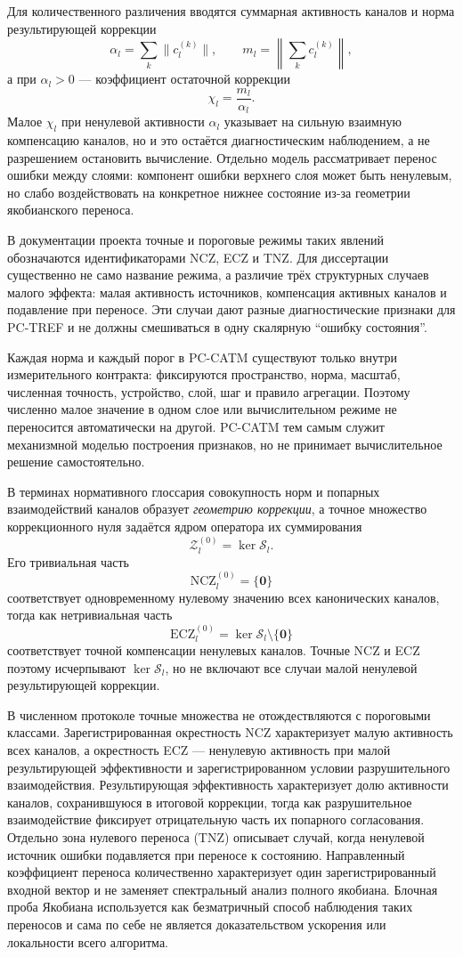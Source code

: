 Для количественного различения вводятся суммарная активность каналов и норма
результирующей коррекции
\[
  \alpha_l=\sum_k\|c_l^{(k)}\|,
  \qquad
  m_l=\left\|\sum_k c_l^{(k)}\right\|,
\]
а при $\alpha_l>0$ --- коэффициент остаточной коррекции
\[
  \chi_l=\frac{m_l}{\alpha_l}.
\]
Малое $\chi_l$ при ненулевой активности $\alpha_l$ указывает на сильную взаимную
компенсацию каналов, но и это остаётся диагностическим наблюдением, а не
разрешением остановить вычисление. Отдельно модель рассматривает перенос
ошибки между слоями: компонент ошибки верхнего слоя может быть ненулевым, но
слабо воздействовать на конкретное нижнее состояние из-за геометрии
якобианского переноса.

В документации проекта точные и пороговые режимы таких явлений обозначаются
идентификаторами NCZ, ECZ и TNZ. Для диссертации существенно не само название
режима, а различие трёх структурных случаев малого эффекта: малая активность
источников, компенсация активных каналов и подавление при переносе. Эти случаи дают
разные диагностические признаки для PC-TREF и не должны смешиваться в одну
скалярную ``ошибку состояния''.

Каждая норма и каждый порог в PC-CATM существуют только внутри измерительного
контракта: фиксируются пространство, норма, масштаб, численная точность,
устройство, слой, шаг и правило агрегации. Поэтому численно малое значение в
одном слое или вычислительном режиме не переносится автоматически на другой.
PC-CATM тем самым служит механизмной моделью построения признаков, но не
принимает вычислительное решение самостоятельно.

В терминах нормативного глоссария совокупность норм и попарных взаимодействий
каналов образует \emph{геометрию коррекции}, а точное множество коррекционного
нуля задаётся ядром оператора их суммирования
\[
  \mathcal Z_l^{(0)}=\ker \mathcal S_l.
\]
Его тривиальная часть
\[
  \mathrm{NCZ}_l^{(0)}=\{\mathbf 0\}
\]
соответствует одновременному нулевому значению всех канонических каналов, тогда
как нетривиальная часть
\[
  \mathrm{ECZ}_l^{(0)}=\ker \mathcal S_l\setminus\{\mathbf 0\}
\]
соответствует точной компенсации ненулевых каналов. Точные NCZ и ECZ поэтому
исчерпывают $\ker \mathcal S_l$, но не включают все случаи малой ненулевой результирующей
коррекции.

В численном протоколе точные множества не отождествляются с пороговыми классами.
Зарегистрированная окрестность NCZ характеризует малую активность всех каналов,
а окрестность ECZ --- ненулевую активность при малой результирующей эффективности
и зарегистрированном условии разрушительного взаимодействия. Результирующая
эффективность характеризует долю активности каналов, сохранившуюся в итоговой
коррекции, тогда как разрушительное взаимодействие фиксирует отрицательную часть
их попарного согласования. Отдельно зона нулевого переноса (TNZ) описывает случай,
когда ненулевой источник ошибки подавляется при переносе к состоянию. Направленный
коэффициент переноса количественно характеризует один зарегистрированный входной
вектор и не заменяет спектральный анализ полного якобиана. Блочная проба Якобиана
используется как безматричный способ наблюдения таких переносов и сама по себе не
является доказательством ускорения или локальности всего алгоритма.

